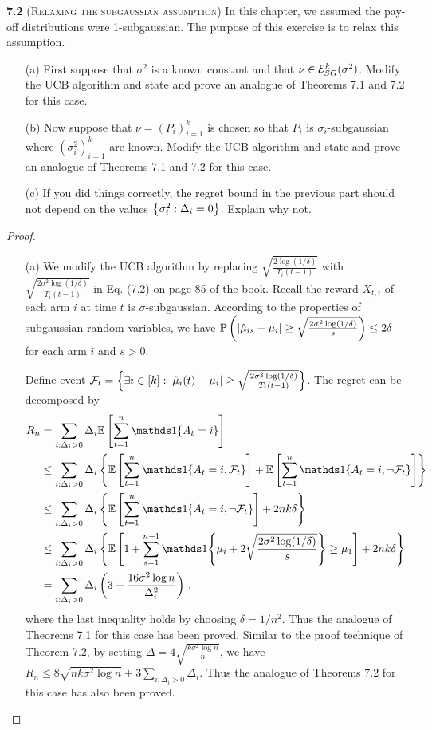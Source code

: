\begin{enumerate}[(a)]
\noindent\textbf{7.2} (\textsc{Relaxing the subgaussian assumption}) In this chapter, we assumed the pay-off distributions were 1-subgaussian. The purpose of this exercise is to relax this assumption. 
\begin{enumerate}
    \item[(a)] First suppose that $\sigma^2$ is a known constant and that $\nu \in \mathcal{E}_{SG}^k (\sigma^2)$. Modify the UCB algorithm and state and prove an analogue of Theorems 7.1 and 7.2 for this case.
    \item[(b)] Now suppose that $\nu =(P_i)_{i=1}^k $ is chosen so that $P_i$ is $\sigma_i$-subgaussian where $(\sigma_i^2)_{i=1}^k$ are known. Modify the UCB algorithm and state and prove an analogue of Theorems 7.1 and 7.2 for this case.
    \item[(c)] If you did things correctly, the regret bound in the previous part should not depend on the values $\left\{ \sigma_i^2:\Delta_i=0 \right\}$. Explain why not.
\end{enumerate}

\begin{proof}
\begin{enumerate}
    \item[(a)] We modify the UCB algorithm by replacing $\sqrt{\frac{2\log (1/\delta)}{T_i(t-1)}}$ with $\sqrt{\frac{2\sigma^2 \log (1/\delta)}{T_i(t-1)}}$ in Eq. (7.2) on page 85 of the book. 
    Recall the reward $X_{t,i}$ of each arm $i$ at time $t$ is $\sigma$-subgaussian. According to the properties of subgaussian random variables, we have $\mathbb{P} \left(\left| \hat{\mu}_{is} - \mu_i  \right|\ge \sqrt{\frac{2\sigma^2 \log (1/\delta)}{s}} \right) \le 2\delta$ for each arm $i$ and $s>0$. 

    Define event $\mathcal{F}_t = \left\{ \exists i \in [k]: \left| \hat{\mu}_{i}(t) - \mu_i  \right|\ge \sqrt{\frac{2\sigma^2 \log (1/\delta)}{T_i(t-1)}} \right\}$. 
    The regret can be decomposed by
    \begin{align*}
        R_n &= \sum_{i:\Delta_i>0}\Delta_i \EE{ \sum_{t=1}^n \bOne{A_t = i} } \\
        &\le \sum_{i:\Delta_i>0}\Delta_i \set{ \EE{ \sum_{t=1}^n \bOne{A_t = i, \cF_t} } +  \EE{ \sum_{t=1}^n \bOne{A_t = i, \neg \cF_t} } } \\
        &\le \sum_{i:\Delta_i>0}\Delta_i \set{ \EE{ \sum_{t=1}^n \bOne{A_t = i, \neg \cF_t} } +  2nk\delta }\\
        &\le \sum_{i:\Delta_i>0}\Delta_i \set{ \EE{ 1+ \sum_{s=1}^{n-1} \bOne{ \mu_i + 2\sqrt{\frac{2\sigma^2 \log (1/\delta)}{s}} } \ge \mu_1 }  +  2nk\delta } \\
        &= \sum_{i:\Delta_i>0}\Delta_i \bracket{ 3 + \frac{16\sigma^2 \log n}{\Delta_i^2}} \,,
    \end{align*}
    where the last inequality holds by choosing $\delta=1/n^2$.  Thus the analogue of Theorems 7.1 for this case has been proved. Similar to the proof technique of Theorem 7.2, by setting $\Delta = 4\sqrt{\frac{k\sigma^2 \log n}{n}}$, we have $R_n \le 8\sqrt{nk\sigma^2 \log n} + 3\sum_{i:\Delta_i >0} \Delta_i$. Thus the analogue of Theorems 7.2 for this case has also been proved. 


\end{enumerate}
\end{proof}
\end{enumerate}

